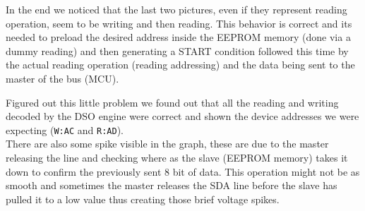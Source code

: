 \documentclass[../main.tex]{subfiles}
\begin{document}
In the end we noticed that the last two pictures, even if they represent reading operation, seem to be writing and then reading. This behavior is correct and its needed to preload the desired address inside the EEPROM memory (done via a dummy reading) and then generating a START condition followed this time by the actual reading operation (reading addressing) and the data being sent to the master of the bus (MCU).

Figured out this little problem we found out that all the reading and writing decoded by the DSO engine were correct and shown the device addresses we were expecting (\texttt{W:AC} and \texttt{R:AD}).\\

There are also some spike visible in the graph, these are due to the master releasing the line and checking where as the slave (EEPROM memory) takes it down to confirm the previously sent 8 bit of data. This operation might not be as smooth and sometimes the master releases the SDA line before the slave has pulled it to a low value thus creating those brief voltage spikes. 
\end{document}
